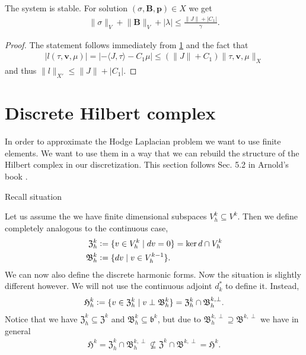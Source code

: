 \documentclass[../master_thesis.tex]{subfiles}
\begin{document}
\begin{theorem}[Stability]
    The system is stable. For solution $(\sigma, \mathbf{B},\mathbf{p}) \in X$
    we get 
    \begin{align*}
        \lVert \sigma \rVert _V + \lVert \mathbf{B} \rVert _V + |\lambda|
        \leq \frac{\lVert J \rVert + |C_1|}{\gamma}.
    \end{align*}
\end{theorem}
\begin{proof}
    The statement follows immediately from \ref{} and the fact that 
    \begin{align*}
        | l(\tau,\mathbf{v},\mu) |
        = | - \langle J, \tau \rangle - C_1 \mu | 
        \leq (\lVert J \rVert + C_1) \lVert \tau,\mathbf{v},\mu \rVert _X
    \end{align*}
    and thus $\lVert l \rVert _{X'} \leq \lVert J \rVert + | C_1 |$.
\end{proof}

\section{Discrete Hilbert complex}

In order to approximate the Hodge Laplacian problem we want to use finite elements.
We want to use them in a way that we can rebuild the structure of the Hilbert complex 
in our discretization. This section follows Sec. 5.2 in Arnold's book \cite{arnold}.

Recall situation

Let us assume the we have finite dimensional subspaces $V_h^k \subseteq V^k$. 
Then we define completely analogous to the continuous case,
\begin{align*}
    \mathfrak{Z}_h^k &\vcentcolon= \{ v \in V_h^k \mid d v = 0 \} = \ker d \cap V^k_h
    \\ \mathfrak{B}^k_h &\vcentcolon= \{ dv \mid v \in V_h^{k-1} \}.
\end{align*}
We can now also define the discrete harmonic forms. Now the situation is slightly 
different however. We will not use the continuous adjoint $d^*_k$ to define it.
Instead,
\begin{align*}
    \mathfrak{H}_h^k \vcentcolon= \{ v \in \mathfrak{Z}_h^k \mid v \perp \mathfrak{B}^k_h \}
        = \mathfrak{Z}_h^k \cap \mathfrak{B}_h^{k,\perp}.
\end{align*}
Notice that we have $\mathfrak{Z}_h^k \subseteq \mathfrak{Z}^k$ and 
$\mathfrak{B}_h^k \subseteq \mathfrak{b}^k$, but due to 
$\mathfrak{B}_h^{k,\perp} \supseteq \mathfrak{B}^{k,\perp}$ we have in general
\begin{align*}
    \mathfrak{H}^k = \mathfrak{Z}_h^k \cap \mathfrak{B}_h^{k,\perp} 
    \not\subseteq    \mathfrak{Z}^k \cap \mathfrak{B}^{k,\perp} = \mathfrak{H}^k.
\end{align*}
\end{document}
